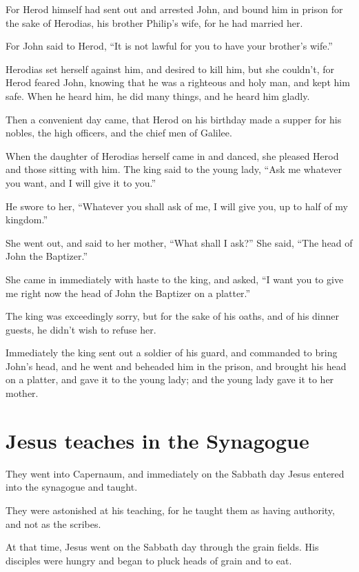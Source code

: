 For Herod himself had sent out and arrested John, and bound him in prison for the sake of Herodias, his brother Philip’s wife, for he had married her.

For John said to Herod, “It is not lawful for you to have your brother’s wife.”

Herodias set herself against him, and desired to kill him, but she couldn’t, for Herod feared John, knowing that he was a righteous and holy man, and kept him safe. When he heard him, he did many things, and he heard him gladly.

Then a convenient day came, that Herod on his birthday made a supper for his nobles, the high officers, and the chief men of Galilee.

When the daughter of Herodias herself came in and danced, she pleased Herod and those sitting with him. The king said to the young lady, “Ask me whatever you want, and I will give it to you.”

He swore to her, “Whatever you shall ask of me, I will give you, up to half of my kingdom.”

She went out, and said to her mother, “What shall I ask?” She said, “The head of John the Baptizer.”

She came in immediately with haste to the king, and asked, “I want you to give me right now the head of John the Baptizer on a platter.”

The king was exceedingly sorry, but for the sake of his oaths, and of his dinner guests, he didn’t wish to refuse her.

Immediately the king sent out a soldier of his guard, and commanded to bring John’s head, and he went and beheaded him in the prison, and brought his head on a platter, and gave it to the young lady; and the young lady gave it to her mother.

\clearpage \section*{Jesus teaches in the Synagogue}
\chapterornament

They went into Capernaum, and immediately on the Sabbath day Jesus entered into the synagogue and taught.

They were astonished at his teaching, for he taught them as having authority, and not as the scribes.

At that time, Jesus went on the Sabbath day through the grain fields. His disciples were hungry and began to pluck heads of grain and to eat.

